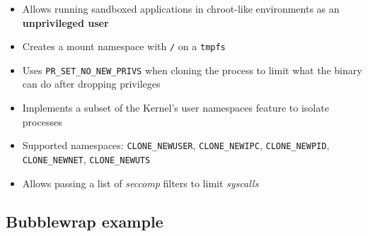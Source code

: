 \begin{frame}[fragile]
  \frametitle{\insertsubsection}

    \begin{itemize}
    \item Allows running sandboxed applications in chroot-like environments as an \textbf{unprivileged user}\vspacing
    \item Creates a mount namespace with \texttt{/} on a \texttt{tmpfs}\vspacing
    \item Uses \texttt{PR\_SET\_NO\_NEW\_PRIVS} when cloning the process to limit what the binary can do after dropping privileges\vspacing
    \item Implements a subset of the Kernel's user namespaces feature to isolate processes\vspacing
    \item Supported namespaces: \small{\texttt{CLONE\_NEWUSER}, \texttt{CLONE\_NEWIPC}, \texttt{CLONE\_NEWPID}, \texttt{CLONE\_NEWNET}, \texttt{CLONE\_NEWUTS}}\vspacing
    \item Allows passing a list of \textit{seccomp} filters to limit \textit{syscalls}\vspacing
    \end{itemize}

\end{frame}

\subsection{Bubblewrap example}


